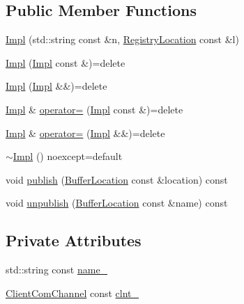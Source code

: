 \subsection*{Public Member Functions}
\begin{DoxyCompactItemize}
\item 
\hyperlink{classregistry_1_1SpringRegistryClient_1_1Impl_a5c16208aad64fd576de9b37cb0d2ce7d}{Impl} (std\+::string const \&n, \hyperlink{structregistry_1_1RegistryLocation}{Registry\+Location} const \&l)
\item 
\hyperlink{classregistry_1_1SpringRegistryClient_1_1Impl_aeb96c2a4edeedf35e6a68bfc04d296d5}{Impl} (\hyperlink{classregistry_1_1SpringRegistryClient_1_1Impl}{Impl} const \&)=delete
\item 
\hyperlink{classregistry_1_1SpringRegistryClient_1_1Impl_aa2ff8d87af51138e71cf20e5f7f05118}{Impl} (\hyperlink{classregistry_1_1SpringRegistryClient_1_1Impl}{Impl} \&\&)=delete
\item 
\hyperlink{classregistry_1_1SpringRegistryClient_1_1Impl}{Impl} \& \hyperlink{classregistry_1_1SpringRegistryClient_1_1Impl_a2a52cac36cd703b782fb2feea1ee55fc}{operator=} (\hyperlink{classregistry_1_1SpringRegistryClient_1_1Impl}{Impl} const \&)=delete
\item 
\hyperlink{classregistry_1_1SpringRegistryClient_1_1Impl}{Impl} \& \hyperlink{classregistry_1_1SpringRegistryClient_1_1Impl_af30a878a4cc61b28f6b9d3e429be79fc}{operator=} (\hyperlink{classregistry_1_1SpringRegistryClient_1_1Impl}{Impl} \&\&)=delete
\item 
\hyperlink{classregistry_1_1SpringRegistryClient_1_1Impl_aaf37891f1445665c32a7c331e7343d67}{$\sim$\+Impl} () noexcept=default
\item 
void \hyperlink{classregistry_1_1SpringRegistryClient_1_1Impl_a1b7694f4de9c0f95fe4ff76c54618057}{publish} (\hyperlink{structregistry_1_1BufferLocation}{Buffer\+Location} const \&location) const
\item 
void \hyperlink{classregistry_1_1SpringRegistryClient_1_1Impl_ac3b721317dfb893e191d3d112575a627}{unpublish} (\hyperlink{structregistry_1_1BufferLocation}{Buffer\+Location} const \&name) const
\end{DoxyCompactItemize}
\subsection*{Private Attributes}
\begin{DoxyCompactItemize}
\item 
std\+::string const \hyperlink{classregistry_1_1SpringRegistryClient_1_1Impl_ad1c90e7182c68d7d48702d8b8329e805}{name\+\_\+}
\item 
\hyperlink{classregistry_1_1ClientComChannel}{Client\+Com\+Channel} const \hyperlink{classregistry_1_1SpringRegistryClient_1_1Impl_ab0b715b0d49462786aa052d732f8207c}{clnt\+\_\+}
\end{DoxyCompactItemize}


